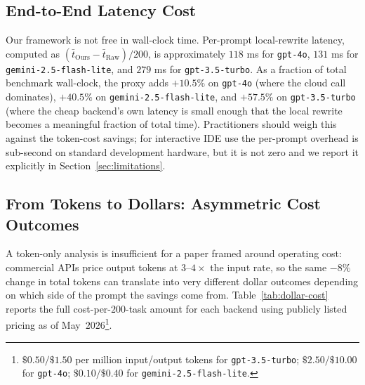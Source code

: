 \documentclass[11pt,a4paper,twocolumn]{article}
\begin{document}
\subsection{End-to-End Latency Cost}
\label{sec:results-latency}
Our framework is not free in wall-clock time. Per-prompt local-rewrite latency, computed as $(\bar{t}_{\text{Ours}} - \bar{t}_{\text{Raw}})/200$, is approximately $118$ ms for \texttt{gpt-4o}, $131$ ms for \texttt{gemini-2.5-flash-lite}, and $279$ ms for \texttt{gpt-3.5-turbo}. As a fraction of total benchmark wall-clock, the proxy adds $+10.5\%$ on \texttt{gpt-4o} (where the cloud call dominates), $+40.5\%$ on \texttt{gemini-2.5-flash-lite}, and $+57.5\%$ on \texttt{gpt-3.5-turbo} (where the cheap backend's own latency is small enough that the local rewrite becomes a meaningful fraction of total time). Practitioners should weigh this against the token-cost savings; for interactive IDE use the per-prompt overhead is sub-second on standard development hardware, but it is not zero and we report it explicitly in Section~\ref{sec:limitations}.

\subsection{From Tokens to Dollars: Asymmetric Cost Outcomes}
\label{sec:results-dollars}
A token-only analysis is insufficient for a paper framed around operating cost: commercial APIs price output tokens at $3$--$4\times$ the input rate, so the same $-8\%$ change in total tokens can translate into very different dollar outcomes depending on which side of the prompt the savings come from. Table~\ref{tab:dollar-cost} reports the full cost-per-$200$-task amount for each backend using publicly listed pricing as of May~$2026$\footnote{$\$0.50/\$1.50$ per million input/output tokens for \texttt{gpt-3.5-turbo}; $\$2.50/\$10.00$ for \texttt{gpt-4o}; $\$0.10/\$0.40$ for \texttt{gemini-2.5-flash-lite}.}.
\end{document}
